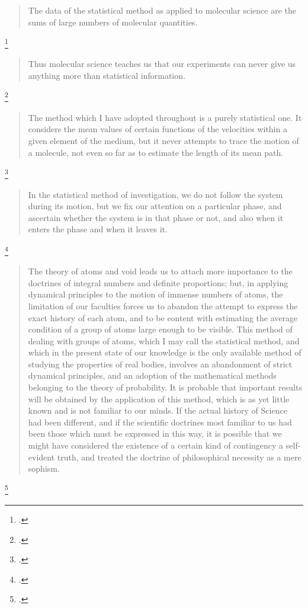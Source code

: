 \documentclass[\ifafour a4paper,12pt,\else a5paper,10pt,\fi%
onecolumn,oneside,article,%
british%
]{memoir}
\theoremstyle{remark}
\theoremstyle{innote}
\newcommand*{\citep}{\footcites}
\renewcommand*{\|}[1][]{\nonscript\:#1\vert\nonscript\:\mathopen{}}
\renewcommand*{\=}{\TextOrMath\texteq\eq}
\newcommand*{\sect}{\S}%
\begin{document}
\begin{quote}
  The data of the statistical method as applied to molecular science are the 
sums of large numbers of molecular quantities. 
\end{quote}
\citep[p.~440]{maxwell1873c}


\begin{quote}
  Thus molecular science teaches us that our experiments can never give us 
anything more than statistical information.
\end{quote}
\citep[p.~440]{maxwell1873c}

\begin{quote}
  The method which I have adopted throughout is a purely statistical one. 
It considers the mean values of certain functions of the velocities within a 
given element of the medium, but it never attempts to trace the motion of a 
molecule, not even so far as to estimate the length of its mean path. 
\end{quote}
\citep[Appendix, p.~249]{maxwell1879}


\begin{quote}
  In the statistical method of investigation, we do not follow the system
  during its motion, but we fix our attention on a particular phase, and
  ascertain whether the system is in that phase or not, and also when it
  enters the phase and when it leaves it.
\end{quote}
\citep[\sect~\emph{Statistical Specification}]{maxwell1879b}


\begin{quote}
  The theory of atoms and void leads us to attach more importance to the doctrines of integral numbers and definite proportions; but, in applying dynamical principles to the motion of immense numbers of atoms, the limitation of our faculties forces us to abandon the attempt to express the exact history of each atom, and to be content with estimating the average condition of a group of atoms large enough to be visible. This method of dealing with groups of atoms, which I may call the statistical method, and which in the present state of our knowledge is the only available method of studying the properties of real bodies, involves an abandonment of strict dynamical principles, and an adoption of the mathematical methods belonging to the theory of probability. It is probable that important results will be obtained by the application of this method, which is as yet little known and is not familiar to our minds. If the actual history of Science had been different, and if the scientific doctrines most familiar to us had been those which must be expressed in this way, it is possible that we might have considered the existence of a certain kind of contingency a self-evident truth, and treated the doctrine of philosophical necessity as a mere sophism.
\end{quote}
\citep[p.~253]{maxwell1871b}
\end{document}
